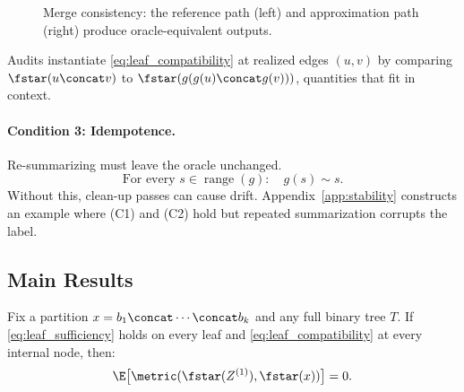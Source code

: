 \begin{figure}[t]
    \centering
    \caption{Merge consistency: the reference path (left) and approximation path (right) produce oracle-equivalent outputs.}
    \label{fig:local_compatibility}
\end{figure}

\begin{remark}\label{rem:edgewise}
Audits instantiate \eqref{eq:leaf_compatibility} at realized edges $(u, v)$ by comparing $\fstar(u \concat v)$ to $\fstar(g(g(u) \concat g(v)))$, quantities that fit in context.
\end{remark}

\paragraph{Condition 3: Idempotence.}
Re-summarizing must leave the oracle unchanged.
\begin{equation}\tag{C3}\label{eq:leaf_idempotence}
\text{For every } s \in \operatorname{range}(g): \quad g(s) \sim s.
\end{equation}
Without this, clean-up passes can cause drift. Appendix~\ref{app:stability} constructs an example where (C1) and (C2) hold but repeated summarization corrupts the label.

\subsection{Main Results}

\begin{theorem}\label{thm:one-pass}
Fix a partition $x = b_1 \concat \cdots \concat b_k$ and any full binary tree $T$. If \eqref{eq:leaf_sufficiency} holds on every leaf and \eqref{eq:leaf_compatibility} at every internal node, then:
\[
\E\big[\metric(\fstar(Z^{(1)}), \fstar(x))\big] = 0.
\]
\end{theorem}

